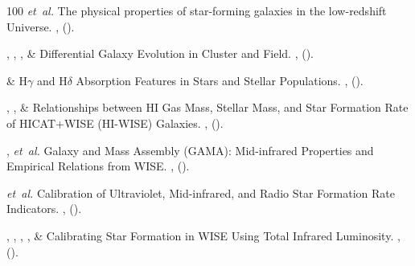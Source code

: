 \documentclass{nature2}
\begin{document}
\begin{thebibliography}{100}
\emph{et~al.}
\newblock The physical properties of star-forming galaxies in the low-redshift Universe.
\newblock \emph{} \textbf{},
 ().

,
,
,
 \&
\newblock Differential Galaxy Evolution in Cluster and Field.
\newblock \emph{} \textbf{},
 ().

 \&
\newblock H\ensuremath{\gamma} and H\ensuremath{\delta} Absorption Features in Stars and Stellar Populations.
\newblock \emph{} \textbf{},
 ().

,
,
 \&
\newblock Relationships between HI Gas Mass, Stellar Mass, and Star Formation Rate of HICAT+WISE (HI-WISE) Galaxies.
\newblock \emph{} \textbf{},
 ().

,
\emph{et~al.}
\newblock Galaxy and Mass Assembly (GAMA): Mid-infrared Properties and Empirical Relations from WISE.
\newblock \emph{} \textbf{},
 ().

\emph{et~al.}
\newblock Calibration of Ultraviolet, Mid-infrared, and Radio Star Formation Rate Indicators.
\newblock \emph{} \textbf{},
 ().

,
, , ,
 \&
\newblock Calibrating Star Formation in WISE Using Total Infrared Luminosity.
\newblock \emph{} \textbf{},
 ().


\end{thebibliography}
\end{document}
